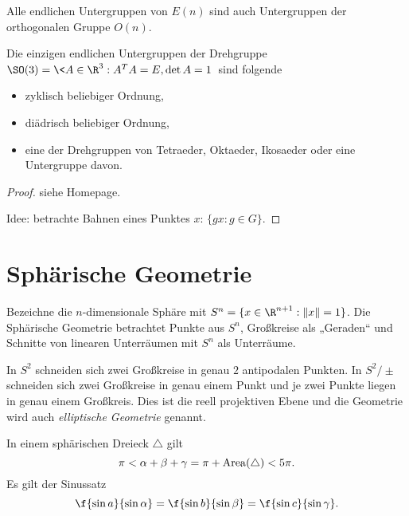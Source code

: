 \begin{kor}
	Alle endlichen Untergruppen von $E(n)$ sind auch Untergruppen der orthogonalen Gruppe $O(n)$.
\end{kor}

\begin{st}
	Die einzigen endlichen Untergruppen der Drehgruppe $\SO (3) = \< A \in \R^3 : A^TA = E, \det A = 1 \>$ sind folgende
	\begin{itemize}
		\item
			zyklisch beliebiger Ordnung,
		\item
			diädrisch beliebiger Ordnung,
		\item
			eine der Drehgruppen von Tetraeder, Oktaeder, Ikosaeder oder eine Untergruppe davon.
	\end{itemize}
	\begin{proof}
		siehe Homepage.

		Idee: betrachte Bahnen eines Punktes $x$: $\{ gx : g \in G \}$.
	\end{proof}
\end{st}


\section{Sphärische Geometrie}


Bezeichne die $n$-dimensionale Sphäre mit $S^n = \{ x \in \R^{n+1} : \|x\| = 1 \}$.
Die Sphärische Geometrie betrachtet Punkte aus $S^n$, Großkreise als „Geraden“ und Schnitte von linearen Unterräumen mit $S^n$ als Unterräume.

In $S^2$ schneiden sich zwei Großkreise in genau $2$ antipodalen Punkten.
In $S^2 / \pm$ schneiden sich zwei Großkreise in genau einem Punkt und je zwei Punkte liegen in genau einem Großkreis.
Dies ist die reell projektiven Ebene und die Geometrie wird auch \emph{elliptische Geometrie} genannt.

In einem sphärischen Dreieck $\triangle$ gilt
\[
	\pi
	< \alpha + \beta + \gamma
	= \pi + \operatorname{Area}(\triangle)
	< 5 \pi.
\]
Es gilt der Sinussatz
\[
	\f {\sin a}{\sin \alpha}
	= \f {\sin b}{\sin \beta}
	= \f {\sin c}{\sin \gamma}.
\]



